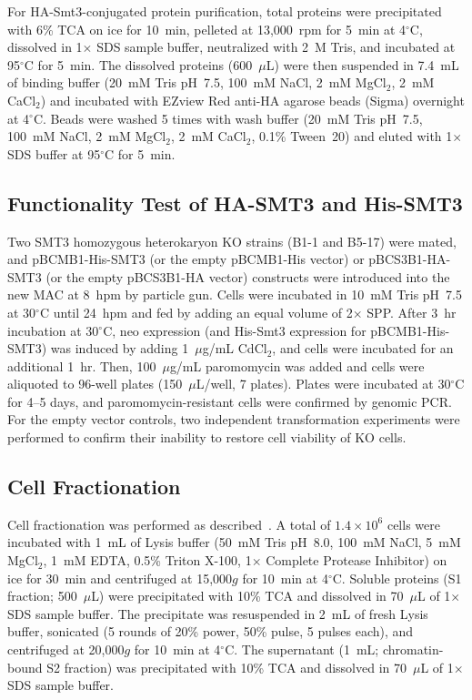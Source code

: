 \documentclass[12pt]{article}
\begin{document}
For HA-Smt3-conjugated protein purification, total proteins were precipitated with 6\% TCA on ice for 10~min, pelleted at 13,000~rpm for 5~min at 4$^{\circ}$C, dissolved in 1$\times$ SDS sample buffer, neutralized with 2~M Tris, and incubated at 95$^{\circ}$C for 5~min.
The dissolved proteins (600~$\mu$L) were then suspended in 7.4~mL of binding buffer (20~mM Tris pH~7.5, 100~mM NaCl, 2~mM MgCl$_{2}$, 2~mM CaCl$_{2}$) and incubated with EZview Red anti-HA agarose beads (Sigma) overnight at 4$^{\circ}$C.
Beads were washed 5 times with wash buffer (20~mM Tris pH~7.5, 100~mM NaCl, 2~mM MgCl$_{2}$, 2~mM CaCl$_{2}$, 0.1\% Tween~20) and eluted with 1$\times$ SDS buffer at 95$^{\circ}$C for 5~min.

\subsection{Functionality Test of HA-SMT3 and His-SMT3}

Two SMT3 homozygous heterokaryon KO strains (B1-1 and B5-17) were mated, and pBCMB1-His-SMT3 (or the empty pBCMB1-His vector) or pBCS3B1-HA-SMT3 (or the empty pBCS3B1-HA vector) constructs were introduced into the new MAC at 8~hpm by particle gun.
Cells were incubated in 10~mM Tris pH~7.5 at 30$^{\circ}$C until 24~hpm and fed by adding an equal volume of 2$\times$ SPP.
After 3~hr incubation at 30$^{\circ}$C, neo expression (and His-Smt3 expression for pBCMB1-His-SMT3) was induced by adding 1~$\mu$g/mL CdCl$_{2}$, and cells were incubated for an additional 1~hr.
Then, 100~$\mu$g/mL paromomycin was added and cells were aliquoted to 96-well plates (150~$\mu$L/well, 7 plates).
Plates were incubated at 30$^{\circ}$C for 4--5 days, and paromomycin-resistant cells were confirmed by genomic PCR.
For the empty vector controls, two independent transformation experiments were performed to confirm their inability to restore cell viability of KO cells.

\subsection{Cell Fractionation}

Cell fractionation was performed as described~\citep{Ali2018}.
A total of $1.4 \times 10^{6}$ cells were incubated with 1~mL of Lysis buffer (50~mM Tris pH~8.0, 100~mM NaCl, 5~mM MgCl$_{2}$, 1~mM EDTA, 0.5\% Triton X-100, 1$\times$ Complete Protease Inhibitor) on ice for 30~min and centrifuged at 15,000$g$ for 10~min at 4$^{\circ}$C.
Soluble proteins (S1 fraction; 500~$\mu$L) were precipitated with 10\% TCA and dissolved in 70~$\mu$L of 1$\times$ SDS sample buffer.
The precipitate was resuspended in 2~mL of fresh Lysis buffer, sonicated (5 rounds of 20\% power, 50\% pulse, 5 pulses each), and centrifuged at 20,000$g$ for 10~min at 4$^{\circ}$C.
The supernatant (1~mL; chromatin-bound S2 fraction) was precipitated with 10\% TCA and dissolved in 70~$\mu$L of 1$\times$ SDS sample buffer.
\end{document}
